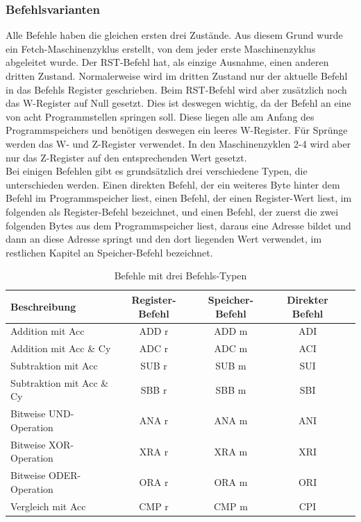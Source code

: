 \documentclass[12pt]{article}
\newcommand{\imgSpaceBefore}{\vspace{10pt}}
\begin{document}
\subsubsection{Befehlsvarianten}
Alle Befehle haben die gleichen ersten drei Zustände. Aus diesem Grund wurde ein Fetch-Maschinenzyklus erstellt, von dem jeder erste Maschinenzyklus abgeleitet wurde. Der RST-Befehl hat, als einzige Ausnahme, einen anderen dritten Zustand. Normalerweise wird im dritten Zustand nur der aktuelle Befehl in das Befehls Register geschrieben. Beim RST-Befehl wird aber zusätzlich noch das W-Register auf Null gesetzt. Dies ist deswegen wichtig, da der Befehl an eine von acht Programmstellen springen soll. Diese liegen alle am Anfang des Programmspeichers und benötigen deswegen ein leeres W-Register. Für Sprünge werden das W- und Z-Register verwendet. In den Maschinenzyklen 2-4 wird aber nur das Z-Register auf den entsprechenden Wert gesetzt.
\\

\noindent
Bei einigen Befehlen gibt es grundsätzlich drei verschiedene Typen, die unterschieden werden. Einen direkten Befehl, der ein weiteres Byte hinter dem Befehl im Programmspeicher liest, einen Befehl, der einen Register-Wert liest, im folgenden als Register-Befehl bezeichnet, und einen Befehl, der zuerst die zwei folgenden Bytes aus dem Programmspeicher liest, daraus eine Adresse bildet und dann an diese Adresse springt und den dort liegenden Wert verwendet, im restlichen Kapitel an Speicher-Befehl bezeichnet.

\imgSpaceBefore
\begin{table}[H]
\centering
\begin{tabular}{|l c c c|c| } 
 \hline
 Beschreibung & Register-Befehl & Speicher-Befehl & Direkter Befehl \\
 \hline 
 Addition mit Acc & ADD r & ADD m & ADI \\ 
 Addition mit Acc \& Cy & ADC r & ADC m & ACI \\ 
 Subtraktion mit Acc & SUB r & SUB m & SUI \\ 
 Subtraktion mit Acc \& Cy & SBB r & SBB m & SBI \\ 
 Bitweise UND-Operation & ANA r & ANA m & ANI \\ 
 Bitweise XOR-Operation & XRA r & XRA m & XRI \\ 
 Bitweise ODER-Operation & ORA r & ORA m & ORI \\ 
 Vergleich mit Acc & CMP r & CMP m & CPI \\ 
 \hline
\end{tabular}
\caption{Befehle mit drei Befehls-Typen}
\label{table:instr_types}
\end{table}
\end{document}
